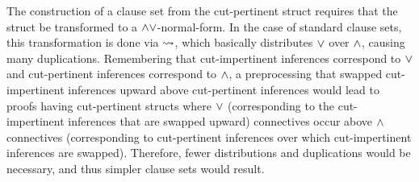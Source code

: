 \documentclass{llncs}
\begin{document}
The construction of a clause set from the cut-pertinent struct requires that the struct be transformed to a $\wedge\vee$-normal-form. In the case of standard clause sets, this transformation is done via $\leadsto$, which basically distributes $\vee$ over $\wedge$, causing many duplications. Remembering that cut-impertinent inferences correspond to $\vee$ and cut-pertinent inferences correspond to $\wedge$, a preprocessing that swapped cut-impertinent inferences upward above cut-pertinent inferences would lead to proofs having cut-pertinent structs where $\vee$ (corresponding to the cut-impertinent inferences that are swapped upward) connectives occur above $\wedge$ connectives (corresponding to cut-pertinent inferences over which cut-impertinent inferences are swapped). Therefore, fewer distributions and duplications would be necessary, and thus simpler clause sets would result.
\end{document}
